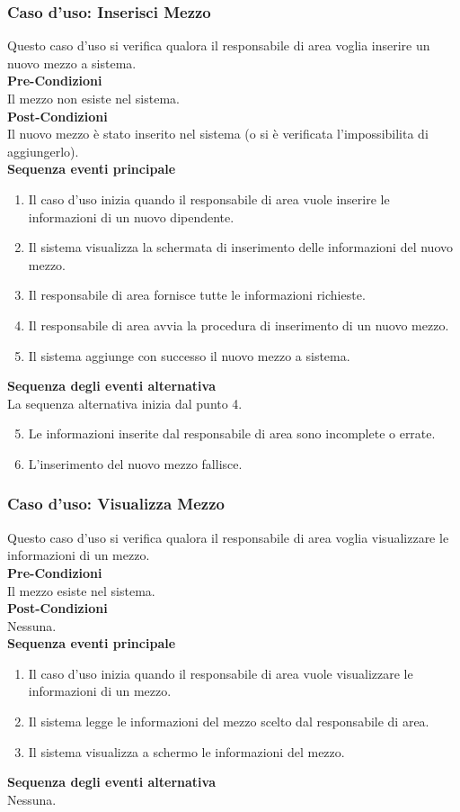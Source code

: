 \documentclass[green, fancy, 11pt]{elegantbook}
\begin{document}
\subsubsection{Caso d'uso: Inserisci Mezzo}

Questo caso d’uso si verifica qualora il responsabile di area voglia inserire un nuovo mezzo a sistema.\\
\textbf{Pre-Condizioni}\\
Il mezzo non esiste nel sistema.\\
\textbf{Post-Condizioni}\\
Il nuovo mezzo è stato inserito nel sistema (o si è verificata l’impossibilita di aggiungerlo).\\
\textbf{Sequenza eventi principale}
\begin{enumerate}
	\item Il caso d’uso inizia quando il responsabile di area vuole inserire le informazioni di un nuovo dipendente.
	\item Il sistema visualizza la schermata di inserimento delle informazioni del nuovo mezzo.
	\item Il responsabile di area fornisce tutte le informazioni richieste.
	\item Il responsabile di area avvia la procedura di inserimento di un nuovo mezzo.
	\item Il sistema aggiunge con successo il nuovo mezzo a sistema.
\end{enumerate}
\textbf{Sequenza degli eventi alternativa}\\
La sequenza alternativa inizia dal punto 4.
\begin{enumerate}
	\setcounter{enumi}{4}
	\item Le informazioni inserite dal responsabile di area sono incomplete o errate.
	\item L’inserimento del nuovo mezzo fallisce.
\end{enumerate}
\newpage

\subsubsection{Caso d'uso: Visualizza Mezzo}

Questo caso d’uso si verifica qualora il responsabile di area voglia visualizzare le informazioni di un mezzo.\\
\textbf{Pre-Condizioni}\\
Il mezzo esiste nel sistema.\\
\textbf{Post-Condizioni}\\
Nessuna.\\
\textbf{Sequenza eventi principale}
\begin{enumerate}
	\item Il caso d’uso inizia quando il responsabile di area vuole visualizzare le informazioni di un mezzo.
	\item Il sistema legge le informazioni del mezzo scelto dal responsabile di area.
	\item Il sistema visualizza a schermo le informazioni del mezzo.
\end{enumerate}
\textbf{Sequenza degli eventi alternativa}\\
Nessuna.
\end{document}
